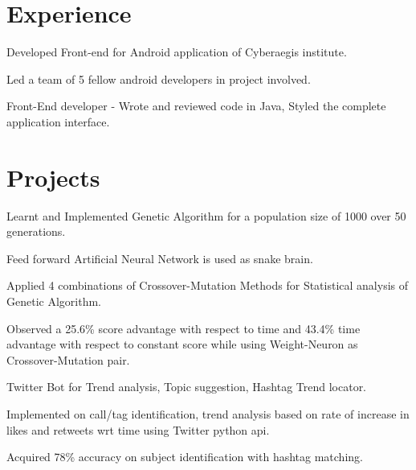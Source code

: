 \documentclass[]{deedy-resume-openfont}
\begin{document}
\hfill
\begin{minipage}[t]{0.66\textwidth} 


\section{Experience}
\vspace{\topsep} %
\begin{tightemize}
\item Developed Front-end for Android application of Cyberaegis institute.
\item Led a team of 5 fellow android developers in project involved. 
\item Front-End developer - Wrote and reviewed code in Java, Styled the complete application interface. 
\end{tightemize}
\sectionsep


\section{Projects}
\begin{tightemize}
\item Learnt and Implemented Genetic Algorithm for a population size of 1000 over 50 generations.
\item Feed forward Artificial Neural Network is used as snake brain.
\item Applied 4 combinations of Crossover-Mutation Methods for Statistical analysis of Genetic Algorithm. 
\item Observed a 25.6\% score advantage with respect to time and 43.4\% time advantage with respect to constant score while using Weight-Neuron as Crossover-Mutation pair. 
\end{tightemize}  

\begin{tightemize}
\item Twitter Bot for Trend analysis, Topic suggestion, Hashtag Trend locator.
\item Implemented on call/tag identification, trend analysis based on rate of increase in likes and retweets wrt time using Twitter python api.
\item Acquired 78\% accuracy on subject identification with hashtag matching. 
\end{tightemize}  


\end{minipage}
\end{document}
